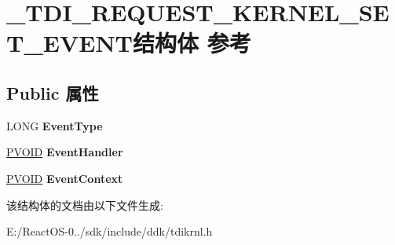 \hypertarget{struct___t_d_i___r_e_q_u_e_s_t___k_e_r_n_e_l___s_e_t___e_v_e_n_t}{}\section{\+\_\+\+T\+D\+I\+\_\+\+R\+E\+Q\+U\+E\+S\+T\+\_\+\+K\+E\+R\+N\+E\+L\+\_\+\+S\+E\+T\+\_\+\+E\+V\+E\+N\+T结构体 参考}
\label{struct___t_d_i___r_e_q_u_e_s_t___k_e_r_n_e_l___s_e_t___e_v_e_n_t}
\subsection*{Public 属性}
\begin{DoxyCompactItemize}
\item 
\mbox{\label{struct___t_d_i___r_e_q_u_e_s_t___k_e_r_n_e_l___s_e_t___e_v_e_n_t_afe8fbe0a7d0c5aae687a5a3ef4b5787a}} 
L\+O\+NG {\bfseries Event\+Type}
\item 
\mbox{\label{struct___t_d_i___r_e_q_u_e_s_t___k_e_r_n_e_l___s_e_t___e_v_e_n_t_ac191f818cf3e36a9e17cbeb3ad1ce5b4}} 
\hyperlink{interfacevoid}{P\+V\+O\+ID} {\bfseries Event\+Handler}
\item 
\mbox{\label{struct___t_d_i___r_e_q_u_e_s_t___k_e_r_n_e_l___s_e_t___e_v_e_n_t_a194079062eb68271c6866148a52d8f57}} 
\hyperlink{interfacevoid}{P\+V\+O\+ID} {\bfseries Event\+Context}
\end{DoxyCompactItemize}


该结构体的文档由以下文件生成\+:\begin{DoxyCompactItemize}
\item 
E\+:/\+React\+O\+S-\/0../sdk/include/ddk/tdikrnl.\+h\end{DoxyCompactItemize}
